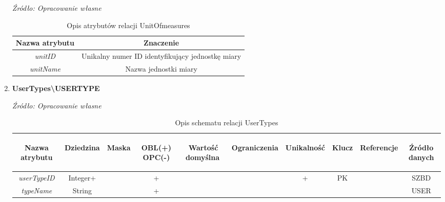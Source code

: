 \documentclass[12pt,oneside]{report}
\begin{document}
\begin{enumerate}[start=10,label={\bfseries REL\textbackslash\arabic*}]
	\begin{table}[H]
		\caption{Opis atrybutów relacji UnitOfmeasures}
		\textit{Źródło: Opracowanie własne}
		\label{UnitOfmeasuresAttributeDescription}
		\centering
		\begin{tabular}{|c|c|}
			\hline
			Nazwa atrybutu & Znaczenie \\
						\hline
			\textit{unitID}&Unikalny numer ID identyfikujący jednostkę miary\\	
			\hline
			\textit{unitName}&Nazwa jednostki miary\\	
			\hline
		\end{tabular}
	\end{table}
\item \textbf{UserTypes\textbackslash USERTYPE}
\begin{table}[H]
	\caption{Opis schematu relacji UserTypes}
	\textit{Źródło: Opracowanie własne}
	\label{UserTypesRelationSchema}
	\centering
	\begin{tabular}{|c|c|c|c|c|c|c|c|c|c|}
		\hline
		\begin{sideways}Nazwa atrybutu\end{sideways}& 
		\begin{sideways}Dziedzina \end{sideways}& 
		\begin{sideways}Maska \end{sideways}& 
		\begin{sideways}OBL(+) OPC(-)\end{sideways} & 
		\begin{sideways}Wartość domyślna$\ $\end{sideways}& 
		\begin{sideways}Ograniczenia\end{sideways} &
		\begin{sideways}Unikalność \end{sideways}& 
		\begin{sideways}Klucz \end{sideways}& 
		\begin{sideways}Referencje \end{sideways}&
		\begin{sideways}Źródło danych\end{sideways}\\
		\hline
		\textit{userTypeID}&Integer+&&+&&&+&PK&&SZBD\\	
		\hline
		\textit{typeName}&String&&+&&&&&&USER\\	
		\hline			
	\end{tabular}
\end{table}


\end{enumerate}
\end{document}
